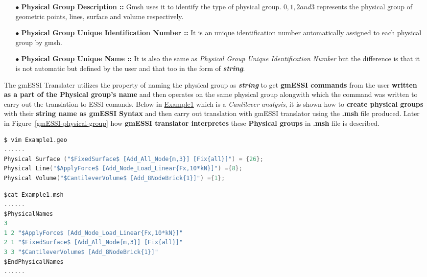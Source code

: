 \documentclass[11pt]{article}
\begin{document}
\begin{itemize}

  \item[$\bullet$]  \textbf{Physical  Group  Description  ::  }  Gmsh uses it to
  identify  the  type  of  physical group. $0,1,2 and 3$ represents the physical
  group of geometric points, lines, surface and volume respectively.
  
  \item[$\bullet$]  \textbf{Physical  Group Unique Identification Number :: } It
  is  an  unique  identification  number automatically assigned to each physical
  group by gmsh.
  
  \item[$\bullet$]  \textbf{Physical  Group Unique Name :: } It is also the same
  as  \textit{Physical Group Unique Identification Number} but the difference is
  that  it  is not automatic but defined by the user and that too in the form of
  \textit{\textbf{string}}.

\end {itemize}

The gmESSI Translater utilizes the property of naming the physical group as
\textit{\textbf{string}} to get \textbf{gmESSI commands} from the user
\textbf{written as a part of the Physical group's name} and then operates on
the same physical group alongwith which the command was written to carry out the
translation to ESSI comands. Below in
\href{http://beta.sumeetsinha.in/gmESSI/Examples/Example1/Example1.geo}
{Example1} which is a \textit{Cantilever analysis}, it is shown how to
\textbf{create physical groups} with their \textbf{string name as gmESSI Syntax}
and then carry out translation with gmESSI translator using the \textbf{.msh}
file produced. Later in Figure~\ref{gmESSI-physical-group} how \textbf{gmESSI
translator interpretes} these \textbf{Physical groups} in \textbf{.msh} file is
described.

\begin{lstlisting}[language=C]
$ vim Example1.geo 
......
Physical Surface ("$FixedSurface$ [Add_All_Node{m,3}] [Fix{all}]") = {26}; 
Physical Line("$ApplyForce$ [Add_Node_Load_Linear{Fx,10*kN}]") ={8};  
Physical Volume("$CantileverVolume$ [Add_8NodeBrick{1}]") ={1};    
\end{lstlisting}

\begin{lstlisting}[language=C]
$cat Example1.msh
......
$PhysicalNames
3
1 2 "$ApplyForce$ [Add_Node_Load_Linear{Fx,10*kN}]"
2 1 "$FixedSurface$ [Add_All_Node{m,3}] [Fix{all}]"
3 3 "$CantileverVolume$ [Add_8NodeBrick{1}]"
$EndPhysicalNames
......
\end{lstlisting}
\end{document}
